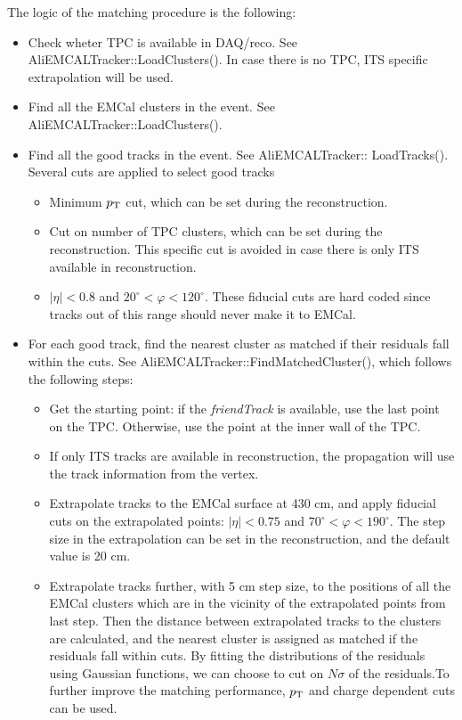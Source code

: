 The logic of the matching procedure is the following:
\begin{itemize}
\item Check wheter TPC is available in DAQ/reco. See AliEMCALTracker::LoadClusters(). In case there is no TPC, ITS specific extrapolation will be used.
\item Find all the EMCal clusters in the event. See AliEMCALTracker::LoadClusters().
\item Find all the good tracks in the event. See AliEMCALTracker:: LoadTracks(). Several cuts are applied to select good tracks
	\begin{itemize}
	\item Minimum $p_{\rm{T}}$ cut, which can be set during the reconstruction.
	\item Cut on number of TPC clusters, which can be set during the reconstruction. This specific cut is avoided in case there is only ITS available in reconstruction. 	
	\item $|\eta|<0.8$ and $20^{\circ} < \varphi < 120^{\circ} $. These fiducial cuts are hard coded since tracks out of this range should never make it to EMCal. 
	\end{itemize}
\item For each good track, find the nearest cluster as matched if their residuals fall within the cuts. See AliEMCALTracker::FindMatchedCluster(), which follows the following steps:
	\begin{itemize}
	\item Get the starting point: if the {\it friendTrack} is available, use the last point on the TPC. Otherwise, use the point at the inner wall of the TPC.
	\item If only ITS tracks are available in reconstruction, the propagation will use the track information from the vertex.  	   
	\item Extrapolate tracks to the EMCal surface at 430 cm, and apply fiducial cuts on the extrapolated points: $|\eta|<0.75$ and $70^{\circ} < \varphi < 190^{\circ} $. The step size in the extrapolation can be set in the reconstruction, and the default value is 20 cm.
	\item Extrapolate tracks further, with 5 cm step size, to the positions of all the EMCal clusters which are in the vicinity of the extrapolated points from last step. Then the distance between extrapolated tracks to the clusters are calculated, and the nearest cluster is assigned as matched if the residuals fall within cuts. By fitting the distributions of the residuals using Gaussian functions, we can choose to cut on $N\sigma$ of the residuals.To further improve the matching performance, $p_{\rm{T}}$ and charge dependent cuts can be used. 
	\end{itemize}
\end{itemize}



